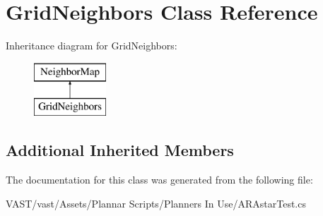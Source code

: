 \hypertarget{class_grid_neighbors}{\section{Grid\-Neighbors Class Reference}
\label{class_grid_neighbors}
}
Inheritance diagram for Grid\-Neighbors\-:\begin{figure}[H]
\begin{center}
\leavevmode
\includegraphics[height=2.000000cm]{class_grid_neighbors}
\end{center}
\end{figure}
\subsection*{Additional Inherited Members}


The documentation for this class was generated from the following file\-:\begin{DoxyCompactItemize}
\item 
V\-A\-S\-T/vast/\-Assets/\-Plannar Scripts/\-Planners In Use/A\-R\-Astar\-Test.\-cs\end{DoxyCompactItemize}
